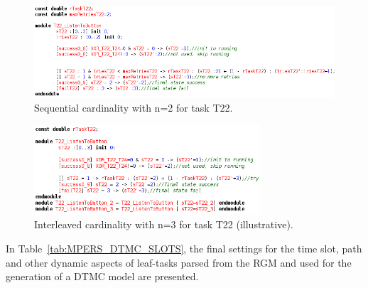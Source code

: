 \begin{figure}[ht!]
\includegraphics[width=1\textwidth]{imgs/PRISM_MUL_SEQ_TSKS.png}
\caption{Sequential cardinality with n=2 for task T22.}
\label{fig:PRISM_MUL_SEQ_TSKS}
\end{figure}

\begin{figure}[ht!]
\includegraphics[width=0.75\textwidth]{imgs/PRISM_MUL_PAR_TSKS.png}
\caption{Interleaved cardinality with n=3 for task T22 (illustrative).}
\label{fig:PRISM_MUL_PAR_TSKS}
\end{figure}

\FloatBarrier



In Table~\ref{tab:MPERS_DTMC_SLOTS}, the final settings for the time slot, path and other dynamic aspects of leaf-tasks parsed from the RGM and used for the generation of a DTMC model are presented.

